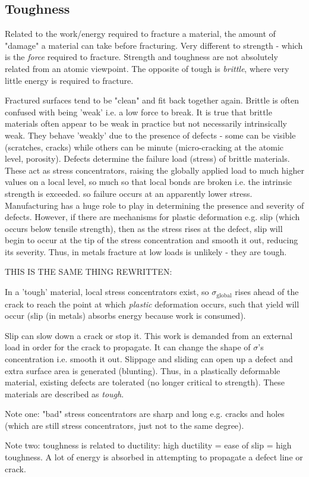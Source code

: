 \documentclass[class=report, crop=false, 12pt,a4paper]{standalone}
\begin{document}
\subsection{Toughness}
Related to the work/energy required to fracture a material, the amount of "damage" a material can take before fracturing. Very different to strength - which is the \emph{force} required to fracture. Strength and toughness are not absolutely related from an atomic viewpoint. The opposite of tough is \emph{brittle}, where very little energy is required to fracture. 

Fractured surfaces tend to be "clean" and fit back together again. Brittle is often confused with being 'weak' i.e. a low force to break. It is true that brittle materials often appear to be weak in practice but not necessarily intrinsically weak. They behave 'weakly' due to the presence of defects - some can be visible (scratches, cracks) while others can be minute (micro-cracking at the atomic level, porosity). Defects determine the failure load (stress) of brittle materials. These act as stress concentrators, raising the globally applied load to much higher values on a local level, so much so that local bonds are broken i.e. the intrinsic strength is exceeded. so failure occurs at an apparently lower stress. Manufacturing has a huge role to play in determining the presence and severity of defects. However, if there are mechanisms for plastic deformation e.g. slip (which occurs below tensile strength), then as the stress rises at the defect, slip will begin to occur at the tip of the stress concentration and smooth it out, reducing its severity. Thus, in metals fracture at low loads is unlikely - they are tough. 

THIS IS THE SAME THING REWRITTEN:

In a 'tough' material, local stress concentrators exist, so \(\sigma_{\textrm{global}}\) rises ahead of the crack to reach the point at which \emph{plastic} deformation occurs, such that yield will occur (slip (in metals) absorbs energy because work is consumed). 

Slip can slow down a crack or stop it. This work is demanded from an external load in order for the crack to propagate. It can change the shape of \(\sigma\)'s concentration i.e. smooth it out. Slippage and sliding can open up a defect and extra surface area is generated (blunting). Thus, in a plastically deformable material, existing defects are tolerated (no longer critical to strength). These materials are described as \emph{tough}.

Note one: "bad" stress concentrators are sharp and long e.g. cracks and holes (which are still stress concentrators, just not to the same degree).

Note two: toughness is related to ductility: high ductility = ease of slip = high toughness. A lot of energy is absorbed in attempting to propagate a defect line or crack. 
\end{document}
